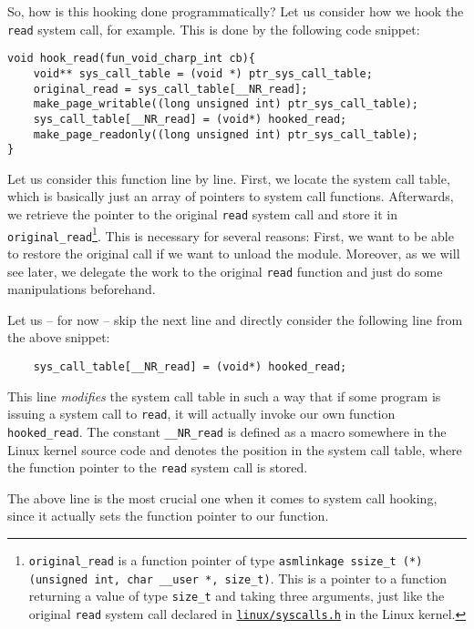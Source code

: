 \documentclass[10pt, letterpaper]{article}
\begin{document}
So, how is this hooking done programmatically? Let us consider how we hook the \texttt{read} system call, for example. This is done by the following code snippet:

\begin{verbatim}
void hook_read(fun_void_charp_int cb){
    void** sys_call_table = (void *) ptr_sys_call_table;
    original_read = sys_call_table[__NR_read];
    make_page_writable((long unsigned int) ptr_sys_call_table);
    sys_call_table[__NR_read] = (void*) hooked_read;
    make_page_readonly((long unsigned int) ptr_sys_call_table);
}
\end{verbatim}

Let us consider this function line by line. First, we locate the system call table, which is basically just an array of pointers to system call functions. Afterwards, we retrieve the pointer to the original \texttt{read} system call and store it in  \texttt{original\_read}\footnote{\texttt{original\_read} is a function pointer of type \texttt{asmlinkage ssize\_t (*)(unsigned int, char \_\_user *, size\_t)}. This is a pointer to a function returning a value of type \texttt{size\_t} and taking three arguments, just like the original \texttt{read} system call declared in \href{http://lxr.linux.no/linux+v2.6.32/arch/x86/include/asm/syscalls.h}{\texttt{linux/syscalls.h}} in the Linux kernel.}. This is necessary for several reasons: First, we want to be able to restore the original call if we want to unload the module. Moreover, as we will see later, we delegate the work to the original \texttt{read} function and just do some manipulations beforehand.

Let us -- for now -- skip the next line and directly consider the following line from the above snippet:

\begin{verbatim}
    sys_call_table[__NR_read] = (void*) hooked_read;
\end{verbatim}

This line \emph{modifies} the system call table in such a way that if some program is issuing a system call to \texttt{read}, it will actually invoke our own function \texttt{hooked\_read}. The constant \texttt{\_\_NR\_read} is defined as a macro somewhere in the Linux kernel source code and denotes the position in the system call table, where the function pointer to the \texttt{read} system call is stored.

The above line is the most crucial one when it comes to system call hooking, since it actually sets the function pointer to our function.
\end{document}
